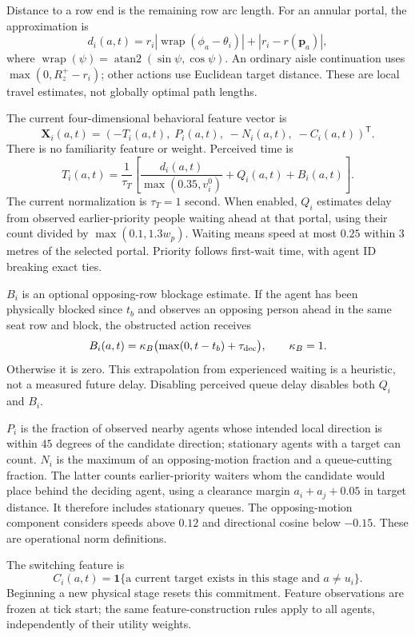\documentclass[11pt]{article}
\newcommand{\ind}{\mathbf{1}}
\newcommand{\wrap}{\operatorname{wrap}}
\begin{document}
Distance to a row end is the remaining row arc length. For an annular portal,
the approximation is
\[
 d_i(a,t)=r_i|\wrap(\phi_a-\theta_i)|+|r_i-r(\mathbf p_a)|,
\]
where $\wrap(\psi)=\operatorname{atan2}(\sin\psi,\cos\psi)$.
An ordinary aisle continuation uses $\max(0,R_z^+-r_i)$; other actions use
Euclidean target distance. These are local travel estimates, not globally
optimal path lengths.

The current four-dimensional behavioral feature vector is
\[
 \mathbf X_i(a,t)=(-T_i(a,t),\;P_i(a,t),\;-N_i(a,t),\;-C_i(a,t))^{\mathsf T}.
\]
There is no familiarity feature or weight. Perceived time is
\[
 T_i(a,t)=\frac{1}{\tau_T}\left[
 \frac{d_i(a,t)}{\max(0.35,v_i^0)}+Q_i(a,t)+B_i(a,t)\right].
\]
The current normalization is $\tau_T=1$ second. When enabled, $Q_i$ estimates
delay from observed earlier-priority people waiting ahead at that portal,
using their count divided by $\max(0.1,1.3w_p)$. Waiting means speed at most
$0.25$ within $3$ metres of the selected portal. Priority follows first-wait
time, with agent ID breaking exact ties.

$B_i$ is an optional opposing-row blockage estimate. If the agent has been
physically blocked since $t_b$ and observes an opposing person ahead in the
same seat row and block, the obstructed action receives
\[
 B_i(a,t)=\kappa_B\bigl(\max(0,t-t_b)+\tau_{\rm dec}\bigr),\qquad\kappa_B=1.
\]
Otherwise it is zero. This extrapolation from experienced waiting is a
heuristic, not a measured future delay. Disabling perceived queue delay
disables both $Q_i$ and $B_i$.

$P_i$ is the fraction of observed nearby agents whose intended local direction
is within $45$ degrees of the candidate direction; stationary agents with
a target can count. $N_i$ is the maximum of an opposing-motion fraction and
a queue-cutting fraction. The latter counts earlier-priority waiters whom
the candidate would place behind the deciding agent, using a clearance
margin $a_i+a_j+0.05$ in target distance. It therefore includes stationary
queues. The opposing-motion component considers speeds above $0.12$ and
directional cosine below $-0.15$. These are operational norm definitions.

The switching feature is
\[
 C_i(a,t)=\ind\{\text{a current target exists in this stage and }a\ne u_i\}.
\]
Beginning a new physical stage resets this commitment. Feature observations
are frozen at tick start; the same feature-construction rules apply to all
agents, independently of their utility weights.
\end{document}
